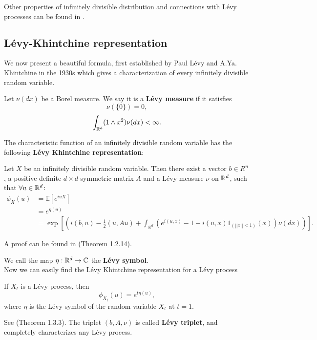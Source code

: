 Other properties of infinitely divisible distribution and connections with Lévy processes can be found in \cite{Sato}.\\

\subsection{Lévy-Khintchine representation}

We now present a beautiful formula, first established by Paul Lévy and A.Ya. Khintchine in the 1930s
which gives a characterization of every infinitely divisible random variable.\\

\begin{Definition} \label{Levy_measure}
Let $\nu(dx)$ be a Borel measure. We say it is a \textbf{Lévy measure} if it satisfies
\begin{equation}
 \nu (\{ 0 \} ) = 0,
\end{equation}
\begin{equation} \label{Levy_m}
 \int_{\mathbb{R}^d} (1\wedge x^2) \nu(dx) < \infty.
\end{equation}
\end{Definition}
The characteristic function of an infinitely divisible random variable has the following \textbf{Lévy Khintchine representation}:
\begin{Theorem}
 Let $X$ be an infinitely divisible random variable. Then there exist a vector $b\in R^n$, a positive definite $d\times d$ symmetric matrix
 $A$ and a Lévy measure $\nu$ on $\mathbb{R}^d$, such that $\forall u \in \mathbb{R}^d$:
\begin{align}
\phi_X(u)  &= \mathbb{E} [e^{iuX}]  \\ 
	   &= e^{\eta(u)} \nonumber \\
	   &= \exp \left[ \left( i(b,u) - \frac{1}{2}(u,Au) + \int_{\mathbb{R}^d} 
	   ( e^{i(u,x)} -1 -i(u,x) 1_{(||x||<1)}(x) ) \nu(dx) \right) \right]. \nonumber		      
\end{align}
\end{Theorem}
A proof can be found in \cite{Applebaum} (Theorem 1.2.14).

We call the map $\eta : \mathbb{R}^d \to \mathbb{C}$ the \textbf{Lévy symbol}.\\

Now we can easily find the Lévy Khintchine representation for a Lévy process
\begin{Theorem}
 If $X_t$ is a Lévy process, then
 \begin{equation}\label{Levy_Kint}
  \phi_{X_t}(u) = e^{t \eta(u)},
 \end{equation}
where $\eta$ is the Lévy symbol of the random variable $X_t$ at $t=1$.
\end{Theorem}
See \cite{Applebaum} (Theorem 1.3.3).
The triplet $(b,A,\nu)$ is called \textbf{Lévy triplet}, and completely characterizes any Lévy process.

